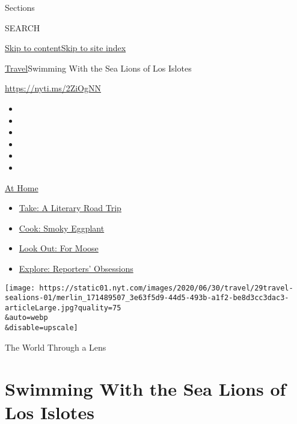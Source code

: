 Sections

SEARCH

\protect\hyperlink{site-content}{Skip to
content}\protect\hyperlink{site-index}{Skip to site index}

\href{/section/travel}{Travel}\textbar{}Swimming With the Sea Lions of
Los Islotes

\url{https://nyti.ms/2ZiOgNN}

\begin{itemize}
\item
\item
\item
\item
\item
\item
\end{itemize}

\href{https://www.nytimes.com/spotlight/at-home?action=click\&pgtype=Article\&state=default\&region=TOP_BANNER\&context=at_home_menu}{At
Home}

\begin{itemize}
\tightlist
\item
  \href{https://www.nytimes.com/2020/07/28/books/time-for-a-literary-road-trip.html?action=click\&pgtype=Article\&state=default\&region=TOP_BANNER\&context=at_home_menu}{Take:
  A Literary Road Trip}
\item
  \href{https://www.nytimes.com/2020/07/29/magazine/bored-with-your-home-cooking-some-smoky-eggplant-will-fix-that.html?action=click\&pgtype=Article\&state=default\&region=TOP_BANNER\&context=at_home_menu}{Cook:
  Smoky Eggplant}
\item
  \href{https://www.nytimes.com/2020/07/27/travel/moose-michigan-isle-royale.html?action=click\&pgtype=Article\&state=default\&region=TOP_BANNER\&context=at_home_menu}{Look
  Out: For Moose}
\item
  \href{https://www.nytimes.com/interactive/2020/at-home/even-more-reporters-editors-diaries-lists-recommendations.html?action=click\&pgtype=Article\&state=default\&region=TOP_BANNER\&context=at_home_menu}{Explore:
  Reporters' Obsessions}
\end{itemize}

\texttt{[image: https://static01.nyt.com/images/2020/06/30/travel/29travel-sealions-01/merlin\_171489507\_3e63f5d9-44d5-493b-a1f2-be8d3cc3dac3-articleLarge.jpg?quality=75\\\&auto=webp\\\&disable=upscale]}

The World Through a Lens

\hypertarget{swimming-with-the-sea-lions-of-los-islotes}{%
\section{Swimming With the Sea Lions of Los
Islotes}\label{swimming-with-the-sea-lions-of-los-islotes}}

